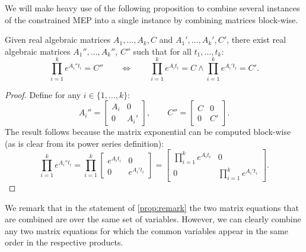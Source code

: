 

We will make heavy use of the following proposition to combine several
instances of the constrained MEP into a single instance by combining
matrices block-wise.
\begin{proposition}\label{prop:remark}
  Given real algebraic matrices $A_1,\ldots,A_k,C$ and
  $A_1',\ldots,A_k',C'$, there exist real algebraic matrices
  $A_1'',\ldots,A_k''$, $C''$ such that for all $t_1,\ldots,t_k$:
\[\prod_{i=1}^{k} e^{A_{i}''t_{i}}=C''\qquad\Leftrightarrow\qquad\prod_{i=1}^{k} e^{A_{i} t_{i}}=C\wedge\prod_{i=1}^{k} e^{A_i't_{i}}=C'.\]
\label{prop:combine}
\end{proposition}

\begin{proof}
Define for any $i\in \lbrace 1,\ldots,k \rbrace$:
\[A_i''=\begin{bmatrix}A_i&0\\0&A_i'\end{bmatrix},\qquad
C''=\begin{bmatrix}C&0\\0&C'\end{bmatrix}.\]
The result follows because the matrix exponential can be computed
block-wise (as is clear from its power series definition):
\[\prod_{i=1}^{k} e^{A_i''t_{i}}=\prod_{i=1}^{k}\begin{bmatrix}e^{A_{i} t_{i}}&0\\0&e^{A_i't_{i}}\end{bmatrix}=
\begin{bmatrix}\prod_{i=1}^{k} e^{A_{i} t_{i}}&0\\0&\prod_{i=1}^{k} e^{A_i't_{i}}\end{bmatrix}.\]
\end{proof}

We remark that in the statement of \cref{prop:remark} the
two matrix equations that are combined are over the same set of
variables.  However, we can clearly combine any two matrix equations
for which the common variables appear in the same order in the
respective products.

